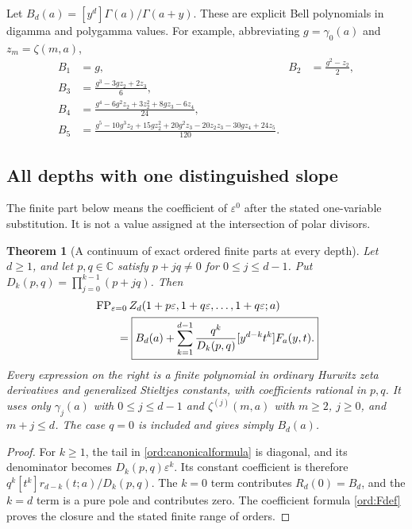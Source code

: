 \documentclass[11pt,letterpaper]{article}
\numberwithin{equation}{section}
\newtheorem{theorem}{Theorem}[section]
\theoremstyle{definition}
\theoremstyle{remark}
\begin{document}
Let $B_d(a)=[y^d]\Gamma(a)/\Gamma(a+y)$.
These are explicit Bell polynomials in digamma and polygamma values.
For example, abbreviating $g=\gamma_0(a)$ and $z_m=\zeta(m,a)$,
\begin{align*}
 B_1&=g,& B_2&=\frac{g^2-z_2}{2},\\
 B_3&=\frac{g^3-3gz_2+2z_3}{6},\\
 B_4&=\frac{g^4-6g^2z_2+3z_2^2+8gz_3-6z_4}{24},\\
 B_5&=\frac{g^5-10g^3z_2+15gz_2^2+20g^2z_3
                   -20z_2z_3-30gz_4+24z_5}{120}.
\end{align*}

\subsection{All depths with one distinguished slope}

The finite part below means the coefficient of $\varepsilon^0$ after
the stated one-variable substitution. It is not a value assigned at the
intersection of polar divisors.

\begin{theorem}[A continuum of exact ordered finite parts at every depth]
\label{ord:oneslope}
Let $d\ge1$, and let $p,q\in\mathbb C$ satisfy
$p+jq\ne0$ for $0\le j\le d-1$. Put
$D_k(p,q)=\prod_{j=0}^{k-1}(p+jq)$.
Then
\begin{align}\label{ord:oneslopeformula}
 &\operatorname{FP}_{\varepsilon=0}
 Z_d(1+p\varepsilon,1+q\varepsilon,\ldots,1+q\varepsilon;a)
 \notag\\
 &\qquad=\boxed{\displaystyle B_d(a)+
 \sum_{k=1}^{d-1}\frac{q^k}{D_k(p,q)}
                      [y^{d-k}t^k]F_a(y,t).}
\end{align}
Every expression on the right is a finite polynomial in ordinary
Hurwitz zeta derivatives and generalized Stieltjes constants, with
coefficients rational in $p,q$. It uses only $\gamma_j(a)$ with
$0\le j\le d-1$ and $\zeta^{(j)}(m,a)$ with
$m\ge2$, $j\ge0$, and $m+j\le d$.
The case $q=0$ is included and gives simply $B_d(a)$.
\end{theorem}

\begin{proof}
For $k\ge1$, the tail in \eqref{ord:canonicalformula} is diagonal,
and its denominator becomes $D_k(p,q)\varepsilon^k$.
Its constant coefficient is therefore
$q^k[t^k]r_{d-k}(t;a)/D_k(p,q)$. The $k=0$ term contributes
$R_d(0)=B_d$, and the $k=d$ term is a pure pole and contributes zero.
The coefficient formula \eqref{ord:Fdef} proves the closure and the
stated finite range of orders.
\end{proof}
\end{document}
